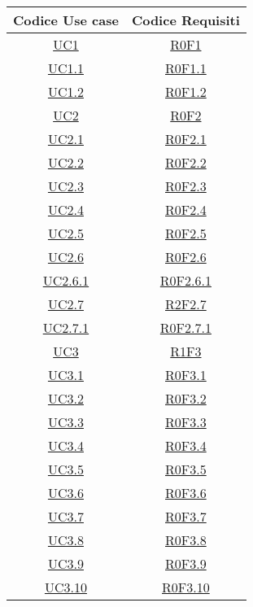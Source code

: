 \begin{longtable}{|c|c|}
\hline
\textbf{Codice Use case} & \textbf{Codice Requisiti} \\
\hline
\endhead
\hyperlink{UC1}{UC1} & \hyperlink{R0F1}{R0F1}\\
\hline
\hyperlink{UC1.1}{UC1.1} & \hyperlink{R0F1.1}{R0F1.1}\\
\hline
\hyperlink{UC1.2}{UC1.2} & \hyperlink{R0F1.2}{R0F1.2}\\
\hline
\hyperlink{UC2}{UC2} & \hyperlink{R0F2}{R0F2}\\
\hline
\hyperlink{UC2.1}{UC2.1} & \hyperlink{R0F2.1}{R0F2.1}\\
\hline
\hyperlink{UC2.2}{UC2.2} & \hyperlink{R0F2.2}{R0F2.2}\\
\hline
\hyperlink{UC2.3}{UC2.3} & \hyperlink{R0F2.3}{R0F2.3}\\
\hline
\hyperlink{UC2.4}{UC2.4} & \hyperlink{R0F2.4}{R0F2.4}\\
\hline
\hyperlink{UC2.5}{UC2.5} & \hyperlink{R0F2.5}{R0F2.5}\\
\hline
\hyperlink{UC2.6}{UC2.6} & \hyperlink{R0F2.6}{R0F2.6}\\
\hline
\hyperlink{UC2.6.1}{UC2.6.1} & \hyperlink{R0F2.6.1}{R0F2.6.1}\\
\hline
\hyperlink{UC2.7}{UC2.7} & \hyperlink{R2F2.7}{R2F2.7}\\
\hline
\hyperlink{UC2.7.1}{UC2.7.1} & \hyperlink{R0F2.7.1}{R0F2.7.1}\\
\hline
\hyperlink{UC3}{UC3} & \hyperlink{R1F3}{R1F3}\\
\hline
\hyperlink{UC3.1}{UC3.1} & \hyperlink{R0F3.1}{R0F3.1}\\
\hline
\hyperlink{UC3.2}{UC3.2} & \hyperlink{R0F3.2}{R0F3.2}\\
\hline
\hyperlink{UC3.3}{UC3.3} & \hyperlink{R0F3.3}{R0F3.3}\\
\hline
\hyperlink{UC3.4}{UC3.4} & \hyperlink{R0F3.4}{R0F3.4}\\
\hline
\hyperlink{UC3.5}{UC3.5} & \hyperlink{R0F3.5}{R0F3.5}\\
\hline
\hyperlink{UC3.6}{UC3.6} & \hyperlink{R0F3.6}{R0F3.6}\\
\hline
\hyperlink{UC3.7}{UC3.7} & \hyperlink{R0F3.7}{R0F3.7}\\
\hline
\hyperlink{UC3.8}{UC3.8} & \hyperlink{R0F3.8}{R0F3.8}\\
\hline
\hyperlink{UC3.9}{UC3.9} & \hyperlink{R0F3.9}{R0F3.9}\\
\hline
\hyperlink{UC3.10}{UC3.10} & \hyperlink{R0F3.10}{R0F3.10}\\

\end{longtable}
